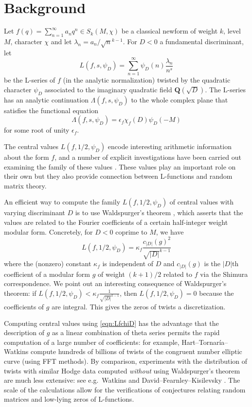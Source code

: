 \documentclass[11pt]{amsart}
\newcommand     {\abs}[1]       {{\left\lvert{#1}\right\rvert}}
\newcommand{\Q}{\ensuremath{\mathbf{Q}}}
\begin{document}
\section{Background}

Let $f(q)=\sum_{n=1}^{\infty} a_n q^n \in S_k(M,\chi)$ be a classical newform of weight $k$, level $M$, character $\chi$ and let $\lambda_n=a_n/\sqrt{n}^{k-1}$.  For $D<0$ a fundamental discriminant, let 
\[ 
L(f,s,\psi_D)=\sum_{n=1}^{\infty}  \psi_D(n)\frac{\lambda_n}{n^s} 
\]
be the L-series of $f$ (in the analytic normalization) twisted by the quadratic character $\psi_D$ associated to the imaginary quadratic field $\Q(\sqrt{D})$.  The L-series has an analytic continuation $\Lambda(f,s,\psi_D)$ to the whole complex plane that satisfies the functional equation
\begin{equation}\label{eqn:FE}
\Lambda(f,s,\psi_D) = \epsilon_f\chi_f(D)\psi_D(-M)
\end{equation}
for some root of unity $\epsilon_f$.


The central values $L(f,1/2,\psi_D)$ encode interesting arithmetic information about the form $f$, and a number of explicit investigations have been carried out examining the family of these values \cite{BSP,Gross,PT2,PT1,MRVT}.  These values play an important role on their own but they also provide connection between L-functions and random matrix theory. 

An efficient way to compute the family $L(f,1/2,\psi_D)$ of central values with varying discriminant $D$ is to use Waldspurger's theorem \cite{Waldspurger}, which asserts that the values are related to the Fourier coefficients of a certain half-integer weight modular form.  Concretely, for $D<0$ coprime to $M$, we have
\begin{equation} \label{eqn:LfchiD}
L(f,1/2,\psi_D) = \kappa_f  \frac{c_{|D|}(g)^2}{\sqrt{\abs{D}}^{k-1}}
\end{equation}
where the (nonzero) constant $\kappa_f$ is independent of $D$ and $c_{|D|}(g)$ is the $|D|$th coefficient of a modular form $g$ of weight $(k+1)/2$ related to $f$ via the Shimura correspondence.  We point out an interesting consequence of Waldspurger's theorem:  if $L(f, 1/2, \psi_D) < \kappa_f  \frac{1}{\sqrt{\abs{D}}^{k-1}}$, then $L(f, 1/2, \psi_D)=0$ because the coefficients of $g$ are integral.  This gives the zeros of twists a discretization.

Computing central values using \eqref{eqn:LfchiD} has the advantage that the description of $g$ as a linear combination of theta series permits the rapid computation of a large number of coefficients: for example, Hart--Tornar\'ia--Watkins \cite{hart2010congruent} compute hundreds of billions of twists of the congruent number elliptic curve (using FFT methods).  By comparison, experiments with the distribution of twists with similar Hodge data computed \emph{without} using Waldspurger's theorem are much less extensive: see e.g.\ Watkins \cite[\S 6.6]{MR2410120} and David--Fearnley--Kisilevsky \cite{MR2322350}.  The scale of the calculations allow for the verifications of conjectures relating random matrices and low-lying zeros of L-functions.
\end{document}
